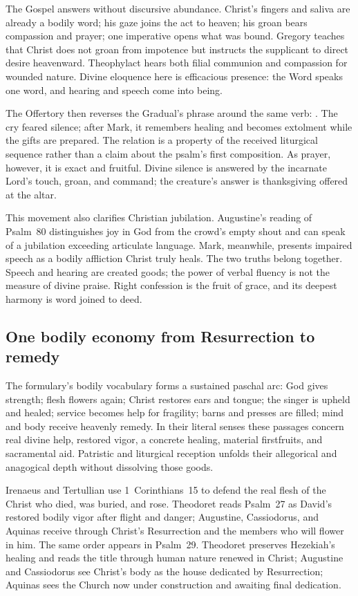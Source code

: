 The Gospel answers without discursive abundance. Christ's fingers and saliva
are already a bodily word; his gaze joins the act to heaven; his groan bears
compassion and prayer; one imperative opens what was bound. Gregory teaches
that Christ does not groan from impotence but instructs the supplicant to direct
desire heavenward. Theophylact hears both filial communion and compassion for
wounded nature. Divine eloquence here is efficacious presence: the Word speaks
one word, and hearing and speech come into being.

The Offertory then reverses the Gradual's phrase around the same verb:
. The cry feared silence; after
Mark, it remembers healing and becomes extolment while the gifts are prepared.
The relation is a property of the received liturgical sequence rather than a
claim about the psalm's first composition. As prayer, however, it is exact and
fruitful. Divine silence is answered by the incarnate Lord's touch, groan, and
command; the creature's answer is thanksgiving offered at the altar.

This movement also clarifies Christian jubilation. Augustine's reading of
Psalm~80 distinguishes joy in God from the crowd's empty shout and can speak of
a jubilation exceeding articulate language. Mark, meanwhile, presents impaired
speech as a bodily affliction Christ truly heals. The two truths belong
together. Speech and hearing are created goods; the power of verbal fluency is
not the measure of divine praise. Right confession is the fruit of grace, and
its deepest harmony is word joined to deed.

\subsection*{One bodily economy from Resurrection to remedy}

The formulary's bodily vocabulary forms a sustained paschal arc: God gives
strength; flesh flowers again; Christ restores ears and tongue; the singer is
upheld and healed; service becomes help for fragility; barns and presses are
filled; mind and body receive heavenly remedy. In their literal senses these
passages concern real divine help, restored vigor, a concrete healing,
material firstfruits, and sacramental aid. Patristic and liturgical reception
unfolds their allegorical and anagogical depth without dissolving those goods.

Irenaeus and Tertullian use 1~Corinthians~15 to defend the real flesh of the
Christ who died, was buried, and rose. Theodoret reads Psalm~27 as David's
restored bodily vigor after flight and danger; Augustine, Cassiodorus, and
Aquinas receive  through Christ's
Resurrection and the members who will flower in him. The same order appears in
Psalm~29. Theodoret preserves Hezekiah's healing and reads the title through
human nature renewed in Christ; Augustine and Cassiodorus see Christ's body as
the house dedicated by Resurrection; Aquinas sees the Church now under
construction and awaiting final dedication.

